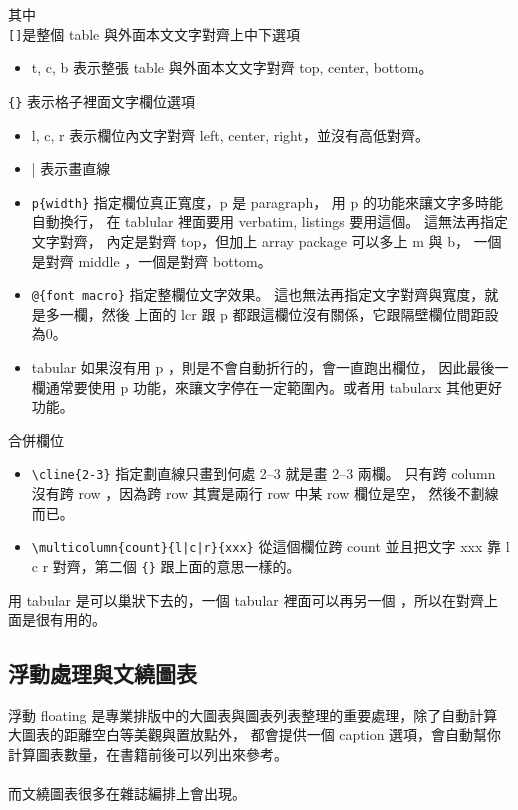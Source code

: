 其中\\
\verb=[]=是整個 table 與外面本文文字對齊上中下選項
\begin{itemize}
\item t, c, b 表示整張 table 與外面本文文字對齊 top, center, bottom。
\end{itemize}
\verb={}= 表示格子裡面文字欄位選項
\begin{itemize}
\item l, c, r 表示欄位內文字對齊 left, center, right，並沒有高低對齊。
\item | 表示畫直線
\item \verb=p{width}= 指定欄位真正寬度，p 是 paragraph，
用 p 的功能來讓文字多時能自動換行， 在 tablular 裡面要用 verbatim, 
listings 要用這個。 這無法再指定文字對齊，
內定是對齊 top，但加上 array package 可以多上 m 與 b，
一個是對齊 middle ，一個是對齊 bottom。
\item \verb=@{font macro}= 指定整欄位文字效果。
這也無法再指定文字對齊與寬度，就是多一欄，然後
上面的 lcr 跟 p 都跟這欄位沒有關係，它跟隔壁欄位間距設為0。
\item tabular 如果沒有用 p ，則是不會自動折行的，會一直跑出欄位，
因此最後一欄通常要使用 p 功能，來讓文字停在一定範圍內。或者用
tabularx 其他更好功能。
\end{itemize}
合併欄位
\begin{itemize}
\item \verb=\cline{2-3}= 指定劃直線只畫到何處 2--3 就是畫 2--3 兩欄。
只有跨 column 沒有跨 row ，因為跨 row 其實是兩行 row 中某 row 欄位是空，
然後不劃線而已。
\item \verb=\multicolumn{count}{l|c|r}{xxx}= 從這個欄位跨 count 並且把文字 xxx 靠
l c r 對齊，第二個 \verb={}= 跟上面的意思一樣的。
\end{itemize}
用 tabular 是可以巢狀下去的，一個 tabular 裡面可以再另一個
，所以在對齊上面是很有用的。

\subsection{浮動處理與文繞圖表}
浮動 floating 是專業排版中的大圖表與圖表列表整理的重要處理，除了自動計算
大圖表的距離空白等美觀與置放點外， 都會提供一個
caption 選項，會自動幫你計算圖表數量，在書籍前後可以列出來參考。
\\\\
而文繞圖表很多在雜誌編排上會出現。

